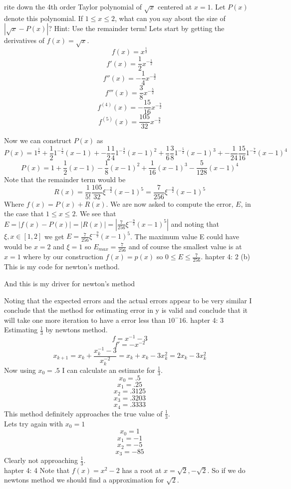 \documentclass[12pt]{article}
\makeatletter
\theoremstyle{homework}
\newenvironment{exercise}[1]
{\def\@currentlabel{#1}\exercisecore}
{\endexercisecore}
\makeatother
\begin{document}
\begin{exercise}

Write down the 4th order Taylor polynomial of $\sqrt{
x}$ centered at $x = 1$. Let $P(x)$ denote
this polynomial. If $1 \leq x \leq 2$, what can you say about the size of $|\sqrt{x} - P(x)|$? Hint: Use
the remainder term!
\end{exercise}
Lets start by getting the derivatives of $f(x)=\sqrt{x}$.
$$f(x)=x^\frac{1}{2}$$
$$f'(x)=\frac{1}{2}x^{-\frac{1}{2}}$$
$$f''(x)=-\frac{1}{4}x^{-\frac{3}{2}}$$
$$f'''(x)=\frac{3}{8}x^{-\frac{5}{2}}$$
$$f^{(4)}(x)=-\frac{15}{16}x^{-\frac{7}{2}}$$
$$f^{(5)}(x)=\frac{105}{32}x^{-\frac{9}{2}}$$

Now we can construct $P(x)$ as 
$$P(x)=1^\frac{1}{2}+\frac{1}{2}1^{-\frac{1}{2}}(x-1)+-\frac{1}{2}\frac{1}{4}1^{-\frac{3}{2}}(x-1)^2+\frac{1}{6}\frac{3}{8}1^{-\frac{5}{2}}(x-1)^3+-\frac{1}{24}\frac{15}{16}1^{-\frac{7}{2}}(x-1)^4$$
$$P(x)=1+\frac{1}{2}(x-1)-\frac{1}{8}(x-1)^2+\frac{1}{16}(x-1)^3-\frac{5}{128}(x-1)^4$$
Note that the remainder term would be
$$R(x)=\frac{1}{5!}\frac{105}{32}\xi^{-\frac{9}{2}}(x-1)^5=\frac{7}{256}\xi^{-\frac{9}{2}}(x-1)^5$$
Where $f(x)=P(x)+R(x)$.
We are now asked to compute the error, $E$, in the case that $1 \leq x \leq 2$. We see that $E=|f(x) - P(x)|=|R(x)|=|\frac{7}{256}\xi^{-\frac{9}{2}}(x-1)^5|$ and noting that $\xi,x\in [1,2]$ we get $E=\frac{7}{256}\xi^{-\frac{9}{2}}(x-1)^5$.  The maximum value E could have would be $x=2$ and $\xi=1$ so $E_{max}=\frac{7}{256}$ and of course the smallest value is at $x=1$ where by our construction $f(x)=p(x)$ so $0\leq E\leq \frac{7}{256}$.
\newpage
\begin{exercise}

Chapter 4: 2 (b)
\end{exercise}
This is my code for newton's method.

\newpage
And this is my driver for newton's method

\newpage

Noting that the expected errors and the actual errors appear to be very similar I conclude that the method for estimating error in y is valid and conclude that it will take one more iteration to have a error less than $10^-16$.
\begin{exercise}

Chapter 4: 3
\end{exercise}
Estimating $\frac{1}{3}$ by newtons method.
$$f=x^{-1}-3$$
$$f'=-x^{-2}$$
$$x_{k+1}=x_k+\frac{x_k^{-1}-3}{x_k^{-2}}
=x_k+x_k-3x_k^2
=2x_k-3x_k^2$$
Now using $x_0=.5$ I can calculate an estimate for $\frac{1}{3}$.
$$x_0=.5$$
$$x_1=.25$$
$$x_2=.3125$$
$$x_3=.3203$$
$$x_4=.3333$$
This method definitely approaches the true value of $\frac{1}{3}$.\\
Lets try again with $x_0=1$
$$x_0=1$$
$$x_1=-1$$
$$x_2=-5$$
$$x_3=-85$$
Clearly not approaching $\frac{1}{3}$.\\
\begin{exercise}

Chapter 4: 4
\end{exercise}
Note that $f(x)=x^2-2$ has a root at $x=\sqrt{2},-\sqrt{2}$.  So if we do newtons method we should find a approximation for $\sqrt{2}$.

\end{document}
